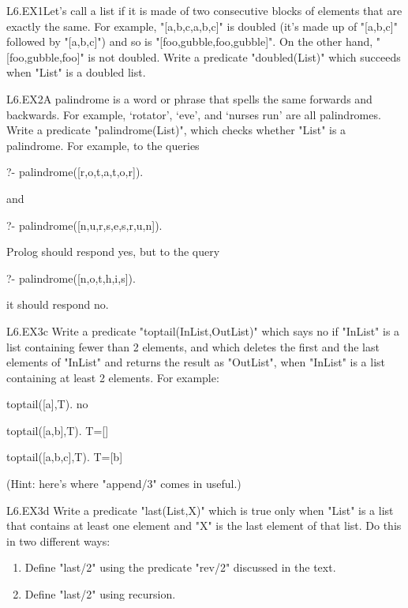 \begin{LPNexercise}{L6.EX1}Let's call a list 
if it is made of two consecutive blocks of elements that are
exactly the same.
For example, "[a,b,c,a,b,c]" is doubled (it's
made up of "[a,b,c]" followed by "[a,b,c]")
and so is "[foo,gubble,foo,gubble]". On the other hand,
"[foo,gubble,foo]" is not doubled. Write a predicate
"doubled(List)" which succeeds when "List"
is a doubled list.\end{LPNexercise}
\begin{LPNexercise}{L6.EX2}A palindrome is a word or phrase that spells the same forwards and
backwards.  For example, `rotator', `eve', and `nurses run' are all
palindromes.  Write a predicate "palindrome(List)", which checks
whether "List" is a palindrome. For example, to the queries
\begin{LPNcodedisplay}
?- palindrome([r,o,t,a,t,o,r]).
\end{LPNcodedisplay}
and
\begin{LPNcodedisplay}
?- palindrome([n,u,r,s,e,s,r,u,n]).
\end{LPNcodedisplay}
Prolog should respond yes, but to the query
\begin{LPNcodedisplay}
?- palindrome([n,o,t,h,i,s]).
\end{LPNcodedisplay}
it should respond no.\end{LPNexercise}



\begin{LPNexercise}{L6.EX3c}
Write a predicate "toptail(InList,OutList)" which says
no if "InList" is a list containing fewer than 2 elements, and
which deletes the first and the last elements of "InList" and
returns the result as "OutList", when "InList" is a
list containing at least 2 elements. For example:
\begin{LPNcodedisplay}
    toptail([a],T).
    no

    toptail([a,b],T).
    T=[]

    toptail([a,b,c],T).
    T=[b]
\end{LPNcodedisplay}

(Hint: here's where "append/3" comes in useful.)
\end{LPNexercise}

\begin{LPNexercise}{L6.EX3d}
Write a predicate "last(List,X)" which is true only when "List" is a
list that contains at least one element and "X" is the last element of
that list. Do this in two different ways:
\begin{enumerate}
\item Define "last/2" using the predicate "rev/2" discussed in the text.
\item Define "last/2" using recursion.
\end{enumerate}
\end{LPNexercise}

